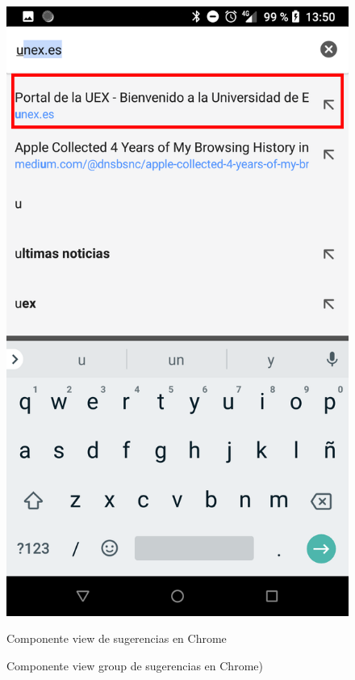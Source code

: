 \documentclass[12pt,a4paper,oneside]{book} %
\begin{document}
\begin{itemize}
\begin{figure}[H]
	\begin{center}
     	\includegraphics[scale=0.2]{pictures/IRL/chrome/chrome_view.png}
	    	\caption{Componente view group de sugerencias en Chrome)}{Componente view de sugerencias en Chrome}
    	\label{fig:Componente view group de Chrome}
	\end{center}
\end{figure}
\end{itemize}
\end{document}
